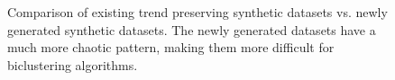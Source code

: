 \begin{figure}[!t]
    \centering
    \qquad
    \qquad
    \caption{
        Comparison of existing trend preserving synthetic datasets vs. newly generated synthetic datasets. The newly generated datasets have a much more chaotic pattern, making them more difficult for biclustering algorithms.
    }
    \label{fig:biclustermodels}
\end{figure}